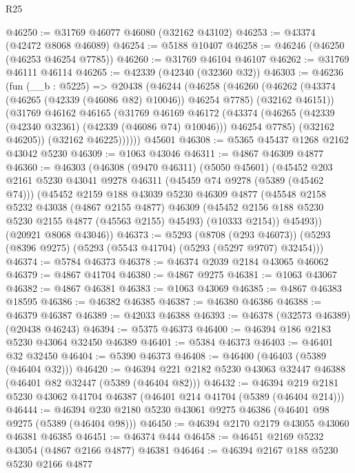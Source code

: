 \begin{lexlean}{R25}
\begin{coremodule}
@46250 := @31769 @46077 @46080 (@32162 @43102)
@46253 := @43374 (@42472 @8068 @46089)
@46254 := @5188 @10407
@46258 := @46246 (@46250 (@46253 @46254 @7785))
@46260 := @31769 @46104 @46107
@46262 := @31769 @46111 @46114
@46265 := @42339 (@42340 (@32360 @32))
@46303 := @46236
    (fun (__b : @5225) =>
    @20438
      (@46244
        (@46258
          (@46260
            (@46262 (@43374 (@46265 (@42339 (@46086 @82) @10046)) @46254 @7785) (@32162 @46151))
            (@31769
              @46162
              @46165
              (@31769
                @46169
                @46172
                (@43374 (@46265 (@42339 (@42340 @32361) (@42339 (@46086 @74) @10046))) @46254 @7785)
                (@32162 @46205))
              (@32162 @46225))))))
    @45601
@46308 := @5365 @45437 @1268 @2162 @43042 @5230
@46309 := @1063 @43046
@46311 := @4867 @46309 @4877
@46360 := @46303
    (@46308
      (@9470 @46311)
      (@5050 @45601)
      (@45452
        @203
        @2161
        @5230
        @43041
        @9278
        @46311
        (@45459 @74 @9278 (@5389 (@45462 @74)))
        (@45452
          @2159
          @188
          @43039
          @5230
          @46309
          @4877
          (@45548
            @2158
            @5232
            @43038
            (@4867 @2155 @4877)
            @46309
            (@45452 @2156 @188 @5230 @5230 @2155 @4877 (@45563 @2155) @45493)
            (@10333 @2154))
          @45493))
      (@20921 @8068 @43046))
@46373 := @5293
    (@8708 (@293 @46073))
    (@5293 (@8396 @9275) (@5293 (@5543 @41704) (@5293 (@5297 @9707) @32454)))
@46374 := @5784 @46373
@46378 := @46374 @2039 @2184 @43065 @46062
@46379 := @4867 @41704
@46380 := @4867 @9275
@46381 := @1063 @43067
@46382 := @4867 @46381
@46383 := @1063 @43069
@46385 := @4867 @46383 @18595
@46386 := @46382 @46385
@46387 := @46380 @46386
@46388 := @46379 @46387
@46389 := @42033 @46388
@46393 := @46378 (@32573 @46389) (@20438 @46243)
@46394 := @5375 @46373
@46400 := @46394 @186 @2183 @5230 @43064 @32450 @46389
@46401 := @5384 @46373
@46403 := @46401 @32 @32450
@46404 := @5390 @46373
@46408 := @46400 (@46403 (@5389 (@46404 @32)))
@46420 := @46394 @221 @2182 @5230 @43063 @32447 @46388 (@46401 @82 @32447 (@5389 (@46404 @82)))
@46432 := @46394 @219 @2181 @5230 @43062 @41704 @46387 (@46401 @214 @41704 (@5389 (@46404 @214)))
@46444 := @46394 @230 @2180 @5230 @43061 @9275 @46386 (@46401 @98 @9275 (@5389 (@46404 @98)))
@46450 := @46394 @2170 @2179 @43055 @43060 @46381 @46385
@46451 := @46374 @444
@46458 := @46451 @2169 @5232 @43054 (@4867 @2166 @4877) @46381
@46464 := @46394 @2167 @188 @5230 @5230 @2166 @4877

\end{coremodule}
\end{lexlean}
